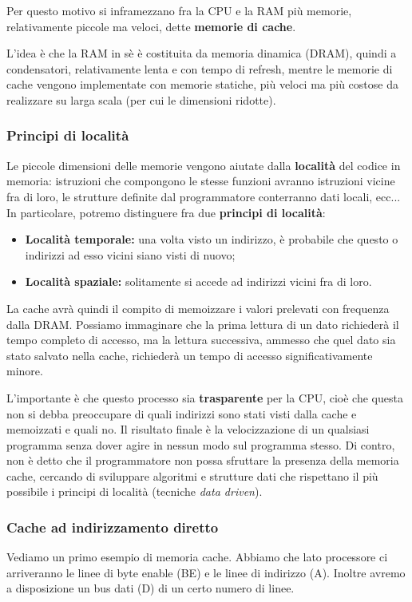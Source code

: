 \documentclass[a4paper,11pt]{article}
\begin{document}
Per questo motivo si inframezzano fra la CPU e la RAM più memorie, relativamente piccole ma veloci, dette \textbf{memorie di cache}.

L'idea è che la RAM in sè è costituita da memoria dinamica (DRAM), quindi a condensatori, relativamente lenta e con tempo di refresh, mentre le memorie di cache vengono implementate con memorie statiche, più veloci ma più costose da realizzare su larga scala (per cui le dimensioni ridotte).

\subsubsection{Principi di località}
Le piccole dimensioni delle memorie vengono aiutate dalla \textbf{località} del codice in memoria: istruzioni che compongono le stesse funzioni avranno istruzioni vicine fra di loro, le strutture definite dal programmatore conterranno dati locali, ecc...
In particolare, potremo distinguere fra due \textbf{principi di località}:
\begin{itemize}
	\item \textbf{Località temporale:} una volta visto un indirizzo, è probabile che questo o indirizzi ad esso vicini siano visti di nuovo;
	\item \textbf{Località spaziale:} solitamente si accede ad indirizzi vicini fra di loro.
\end{itemize}

\par\smallskip

La cache avrà quindi il compito di memoizzare i valori prelevati con frequenza dalla DRAM.
Possiamo immaginare che la prima lettura di un dato richiederà il tempo completo di accesso, ma la lettura successiva, ammesso che quel dato sia stato salvato nella cache, richiederà un tempo di accesso significativamente minore.

L'importante è che questo processo sia \textbf{trasparente} per la CPU, cioè che questa non si debba preoccupare di quali indirizzi sono stati visti dalla cache e memoizzati e quali no.
Il risultato finale è la velocizzazione di un qualsiasi programma senza dover agire in nessun modo sul programma stesso.
Di contro, non è detto che il programmatore non possa sfruttare la presenza della memoria cache, cercando di sviluppare algoritmi e strutture dati che rispettano il più possibile i principi di località (tecniche \textit{data driven}).

\subsubsection{Cache ad indirizzamento diretto}
Vediamo un primo esempio di memoria cache.
Abbiamo che lato processore ci arriveranno le linee di byte enable (BE) e le linee di indirizzo (A).
Inoltre avremo a disposizione un bus dati (D) di un certo numero di linee.
\end{document}

